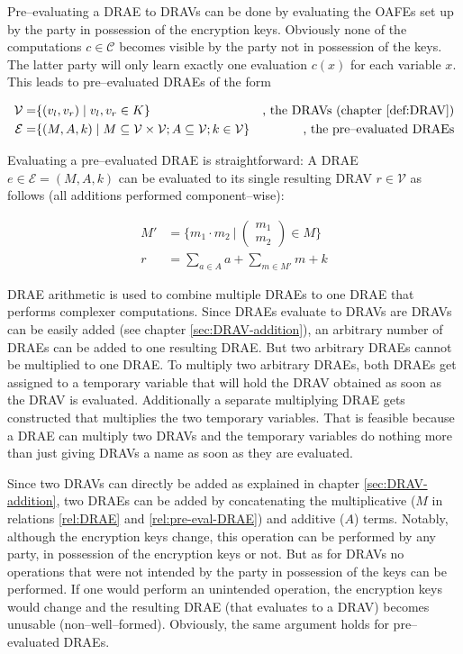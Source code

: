 Pre--evaluating a DRAE to DRAVs can be done by evaluating the OAFEs set up by
the party in possession of the encryption keys. Obviously none of the
computations $c \in \mathcal{C}$ becomes visible by the party not in possession
of the keys. The latter party will only learn exactly one evaluation $c(x)$ for
each variable $x$. This leads to pre--evaluated DRAEs of the form

\begin{align}
  \mathcal{V} = & \{ (v_l, v_r) \mid v_l, v_r \in K \}
  &\text{, the DRAVs (chapter \ref{def:DRAV})} \nonumber\\
%
  \label{rel:pre-eval-DRAE}
  \mathcal{E} = & \{ (M, A, k) \mid
      M \subseteq \mathcal{V} \times \mathcal{V};
      A \subseteq \mathcal{V};
      k \in \mathcal{V} \}
      &\text{, the pre--evaluated DRAEs}
\end{align}

Evaluating a pre--evaluated DRAE is straightforward: A DRAE $e \in \mathcal{E} =
(M,A, k)$ can be evaluated to its single resulting DRAV $r \in \mathcal{V}$ as
follows (all additions performed component--wise):

\begin{align*}
M' &= \Bigg\{ m_1 \cdot m_2\ \Bigg|\ \begin{pmatrix}m_1\\m_2\end{pmatrix}
\in M \Bigg\} \\
r & = \sum_{a \in A}a + \sum_{m \in M'}m + k
\end{align*}



DRAE arithmetic is used to combine multiple DRAEs to one DRAE that performs
complexer computations. Since DRAEs evaluate to DRAVs are DRAVs can be easily
added (see chapter \ref{sec:DRAV-addition}), an arbitrary number of
DRAEs can be added to one resulting DRAE. But two arbitrary DRAEs cannot be
multiplied to one DRAE. To multiply two arbitrary DRAEs, both DRAEs get assigned
to a temporary variable that will hold the DRAV obtained as soon as the DRAV is
evaluated. Additionally a separate multiplying DRAE gets constructed that
multiplies the two temporary variables. That is feasible because a DRAE can
multiply two DRAVs and the temporary variables do nothing more than just giving
DRAVs a name as soon as they are evaluated.


Since two DRAVs can directly be added as explained in chapter
\ref{sec:DRAV-addition}, two DRAEs can be added by concatenating the
multiplicative ($M$ in relations \ref{rel:DRAE} and \ref{rel:pre-eval-DRAE}) and
additive ($A$) terms. Notably, although the encryption keys change, this
operation can be performed by any party, in possession of the encryption keys or
not. But as for DRAVs no operations that were not intended by the party in
possession of the keys can be performed. If one would perform an unintended
operation, the encryption keys would change and the resulting DRAE (that
evaluates to a DRAV) becomes unusable (non--well--formed). Obviously, the same
argument holds for pre--evaluated DRAEs.



